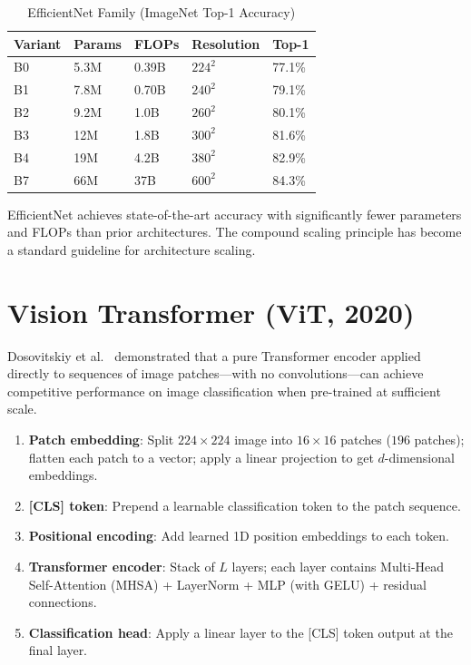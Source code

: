 \begin{table}[ht]
    \centering
    \caption{EfficientNet Family (ImageNet Top-1 Accuracy)}
    \begin{tabular}{L{2cm} L{2cm} L{2cm} L{3cm} L{2.5cm}}
        \toprule
        \textbf{Variant} & \textbf{Params} & \textbf{FLOPs} & \textbf{Resolution} & \textbf{Top-1} \\
        \midrule
        B0 & 5.3M & 0.39B & $224^2$ & 77.1\% \\
        B1 & 7.8M & 0.70B & $240^2$ & 79.1\% \\
        B2 & 9.2M & 1.0B & $260^2$ & 80.1\% \\
        B3 & 12M & 1.8B & $300^2$ & 81.6\% \\
        B4 & 19M & 4.2B & $380^2$ & 82.9\% \\
        B7 & 66M & 37B & $600^2$ & 84.3\% \\
        \bottomrule
    \end{tabular}
\end{table}

EfficientNet achieves state-of-the-art accuracy with significantly fewer parameters and FLOPs than prior architectures. The compound scaling principle has become a standard guideline for architecture scaling.

\section{Vision Transformer (ViT, 2020)}

Dosovitskiy et al.\ \cite{dosovitskiy2020image} demonstrated that a pure Transformer encoder applied directly to sequences of image patches---with no convolutions---can achieve competitive performance on image classification when pre-trained at sufficient scale.

\begin{architecture}
\begin{enumerate}
    \item \textbf{Patch embedding}: Split $224\times224$ image into $16\times16$ patches ($196$ patches); flatten each patch to a vector; apply a linear projection to get $d$-dimensional embeddings.
    \item \textbf{[CLS] token}: Prepend a learnable classification token to the patch sequence.
    \item \textbf{Positional encoding}: Add learned 1D position embeddings to each token.
    \item \textbf{Transformer encoder}: Stack of $L$ layers; each layer contains Multi-Head Self-Attention (MHSA) + LayerNorm + MLP (with GELU) + residual connections.
    \item \textbf{Classification head}: Apply a linear layer to the [CLS] token output at the final layer.
\end{enumerate}
\end{architecture}

